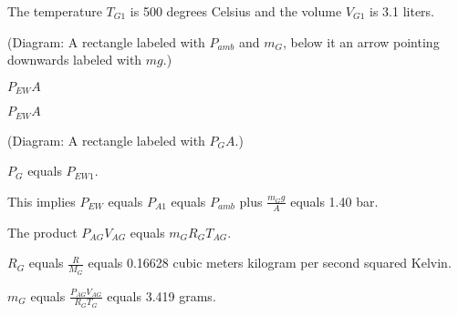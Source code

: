 The temperature \( T_{G1} \) is 500 degrees Celsius and the volume \( V_{G1} \) is 3.1 liters.

(Diagram: A rectangle labeled with \( P_{amb} \) and \( m_G \), below it an arrow pointing downwards labeled with \( mg \).)

\( P_{EW} A \)

\( P_{EW} A \)

(Diagram: A rectangle labeled with \( P_G A \).)

\( P_G \) equals \( P_{EW1} \).

This implies \( P_{EW} \) equals \( P_{A1} \) equals \( P_{amb} \) plus \( \frac{m_G g}{A} \) equals 1.40 bar.

The product \( P_{AG} V_{AG} \) equals \( m_G R_G T_{AG} \).

\( R_G \) equals \( \frac{R}{M_G} \) equals 0.16628 cubic meters kilogram per second squared Kelvin.

\( m_G \) equals \( \frac{P_{AG} V_{AG}}{R_G T_{G}} \) equals 3.419 grams.